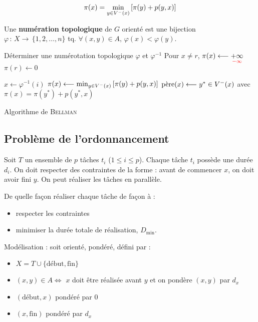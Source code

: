 \documentclass[a4paper, 8pt]{article}
\begin{document}
\begin{multicols*}{3}
\[ \pi(x) = \displaystyle \min_{y\in \Vm(x)}\left[\pi(y) + p(y,x)\right] \]

Une \textbf{numération topologique} de $G$ orienté est une bijection $\varphi\,:\,X\rightarrow\,\{1,2,\ldots,n\}$ tq. $\forall (x,y)\in A, \,\varphi(x) < \varphi(y)$.


\begin{algorithm}[H]
 Déterminer une numérotation topologique $\varphi$ et $\varphi^{-1}$ \;
 Pour $x\neq r$, $\pi(x) \longleftarrow \underset{\tred{-\infty}}{+\infty}$\;
 $\pi(r) \longleftarrow 0$ \;
 
 {
 	$x \longleftarrow \varphi^{-1}(i)$ \;
 	$\pi(x) \longleftarrow \min_{y\in \Vm(x)}\left[\pi(y) + p(y,x)\right]$ \;
 	{\footnotesize {} }
 	$\pere(x) \longleftarrow y^*\in \Vm(x)$ avec $\pi(x) = \pi(y^*) + p(y^*,x)$ \;
 }
 
 \caption{Algorithme de \textsc{Bellman}}
\end{algorithm}

 \subsection*{Problème de l'ordonnancement}
 
\newcommand{\Dmin}{D_{\text{min}}} 
\newcommand{\debut}{\text{début}}
\newcommand{\fin}{\text{fin}}
 
 Soit $T$ un ensemble de $p$ tâches $t_i$ ($1\leqslant i\leqslant p$). Chaque tâche $t_i$ possède une durée $d_i$. On doit respecter des contraintes de la forme : avant de commencer $x$, on doit avoir fini $y$. On peut réaliser les tâches en parallèle.
 
De quelle façon réaliser chaque tâche de façon à :
\begin{itemize}
	\item respecter les contraintes
	\item minimiser la durée totale de réalisation, $\Dmin$.
\end{itemize}

Modélisation : soit \GXA orienté, pondéré, défini par :
\begin{itemize}
	\item $X = T \cup \{\debut,\fin\}$
	\item $(x,y)\in A \Longleftrightarrow$ $x$ doit être réalisée avant $y$ et on pondère $(x,y)$ par $d_x$
	\item $(\debut,x)$ pondéré par 0
	\item $(x,\fin)$ pondéré par $d_x$
\end{itemize}


\end{multicols*}
\end{document}
